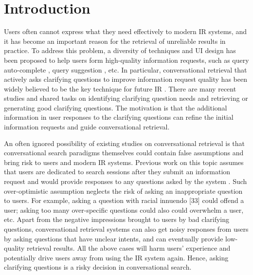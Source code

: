 \documentclass[format=acmsmall, review=False, screen=true]{acmart}
\begin{document}


\maketitle

\section{Introduction}

Users often cannot express what they need effectively to modern IR systems, and it has become an important reason for the retrieval of unreliable results in practice. To address this problem, a diversity of techniques and UI design has been proposed to help users form high-quality information requests, such as query auto-complete \cite{autocomplete}, query suggestion \cite{querysuggestion1, querysuggestion2, querysuggestion3, querysuggestion4}, etc. In particular, conversational retrieval that actively asks clarifying questions to improve information request quality has been widely believed to be the key technique for future IR \cite{framework2017}. There are many recent studies and shared tasks \cite{whatdoyoumean, cqidentify, raodaume2019, xuasking2019, askingcq,zamania} \cite{trechard,aliannejadi2020convai3} on identifying clarifying question needs and retrieving or generating good clarifying questions. The motivation is that the additional information in user responses to the clarifying questions can refine the initial information requests and guide conversational retrieval.

An often ignored possibility of existing studies on conversational retrieval is that conversational search paradigms themselves could contain false assumptions and bring risk to users and modern IR systems. Previous work on this topic assumes that users are dedicated to search sessions after they submit an information request and would provide responses to any questions asked by the system \cite{aorb, systemaskuserrespond, conversationalrecommend, negativefeedback}. Such over-optimistic assumption neglects the risk of asking an inappropriate question to users. For example, asking a question with racial innuendo [33] could offend a user; asking too many over-specific questions could also could overwhelm a user, etc. Apart from the negative impressions brought to users by bad clarifying questions, conversational retrieval systems can also get noisy responses from users by asking questions that have unclear intents, and can eventually provide low-quality retrieval results. All the above cases will harm users' experience and potentially drive users away from using the IR system again. Hence, asking clarifying questions is a risky decision in conversational search. 
\end{document}
